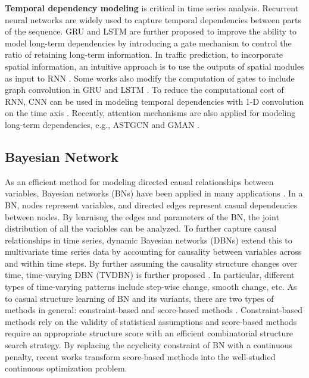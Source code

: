 \documentclass[letterpaper, 10 pt, conference]{ieeeconf}
\newcommand{\revise}[1]{{\color{black}{#1}}}
\begin{document}
\textbf{Temporal dependency modeling} is critical in time series analysis. Recurrent neural networks are widely used to capture temporal dependencies between parts of the sequence. 
GRU \cite{cho2014learning} and LSTM \cite{hochreiter1997long} are further proposed to improve the ability to model long-term dependencies by introducing a gate mechanism to control the ratio of retaining long-term information. In traffic prediction, to incorporate spatial information, an intuitive approach is to use the outputs of spatial modules as input to RNN \cite{zhao2019t}. Some works also modify the computation of gates to include graph convolution in GRU and LSTM \cite{li2017diffusion, bai2020adaptive}. To reduce the computational cost of RNN, CNN can be used in modeling temporal dependencies with 1-D convolution on the time axis \cite{yu2017spatio}. Recently, attention mechanisms are also applied for modeling long-term dependencies, e.g., ASTGCN \cite{guo2019attention} and GMAN \cite{zheng2020gman}. 


\subsection{Bayesian Network}


As an efficient method for modeling directed causal relationships between variables, Bayesian networks (BNs) have been applied in many applications \cite{hossain2019framework, tsagris2021new}. \revise{BN is a probabilistic graphical model that takes the form of a directed acyclic graphs (DAG).} In a BN, nodes represent variables, and directed edges represent casual dependencies between nodes. By learnisng the edges and parameters of the BN, the joint distribution of all the variables can be analyzed. To further capture causal relationships in time series, dynamic Bayesian networks (DBNs) \cite{murphy2002dynamic} extend this to multivariate time series data by accounting for causality between variables across and within time steps. By further assuming the causality structure changes over time, time-varying DBN (TVDBN) is further proposed \cite{robinson2008non}. In particular, different types of time-varying patterns include step-wise change, smooth change, etc. As to casual structure learning of BN and its variants, there are two types of methods in general: constraint-based and score-based methods \cite{vowels2022d}. Constraint-based methods \cite{runge2019detecting} rely on the validity of statistical assumptions and score-based methods \cite{zheng2018dags} require an appropriate structure score with an efficient combinatorial structure search strategy. By replacing the acyclicity constraint of BN with a continuous penalty, recent works \cite{zheng2018dags} transform score-based methods into the well-studied continuous optimization problem.
\end{document}
